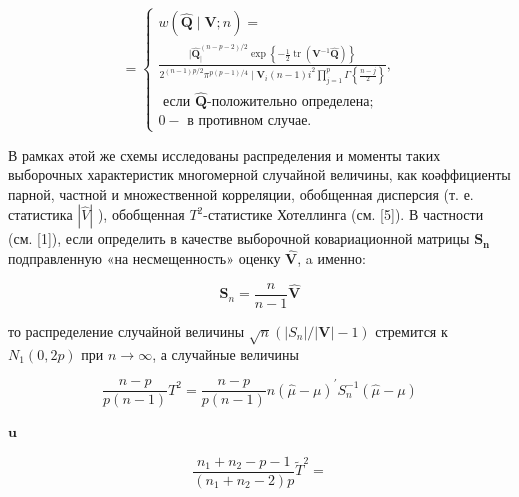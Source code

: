 \documentclass[10pt]{article}
\begin{document}
\[

=\left\{\begin{array}{c}

w(\hat{\boldsymbol{Q}} \mid \boldsymbol{V} ; n)= \\

\frac{\mid \hat{\boldsymbol{Q}}_{\mid}^{(n-p-2) / 2} \exp \left\{-\frac{1}{2} \operatorname{tr}\left(\boldsymbol{V}^{-1} \hat{\boldsymbol{Q}}\right)\right\}}{2^{(n-1) p / 2} \pi^{p(p-1) / 4} \mid \boldsymbol{V}_{i}(n-1) i^{2} \prod_{j=1}^{p} \Gamma\left\{\frac{n-j}{2}\right\}}, \\

\text { если } \hat{\boldsymbol{Q}} \text {-положительно определена; } \\

0-\text { в противном случае. }

\end{array}\right.

\]



В рамках әтой же схемы исследованы распределения и моменты таких выборочных характеристик многомерной случайной величины, как коәффициенты парной, частной и множественной корреляции, обобщенная дисперсия (т. е. статистика $|\hat{V}|$ ), обобщенная $T^{2}$-статистике Хотеллинга (см. [5]). В частности (см. [1]), если определить в качестве выборочной ковариационной матрицы $\boldsymbol{S}_{\boldsymbol{n}}$ подправленную «на несмещенность» оценку $\widehat{\boldsymbol{V}}$, a именно:



\[

\boldsymbol{S}_{n}=\frac{n}{n-1} \widehat{\boldsymbol{V}}

\]



то распределение случайной величины $\sqrt{n}\left(\left|S_{n}\right| /|\boldsymbol{V}|-1\right)$ стремится к $N_{1}(0,2 p)$ при $n \rightarrow \infty$, а случайные величины



\[

\frac{n-p}{p(n-1)} T^{2}=\frac{n-p}{p(n-1)} n(\hat{\mu}-\mu)^{\prime} S_{n}^{-1}(\hat{\mu}-\mu)

\]



$\mathbf{u}$



\[

\frac{n_{1}+n_{2}-p-1}{\left(n_{1}+n_{2}-2\right) p} \tilde{T}^{2}=

\]
\end{document}
